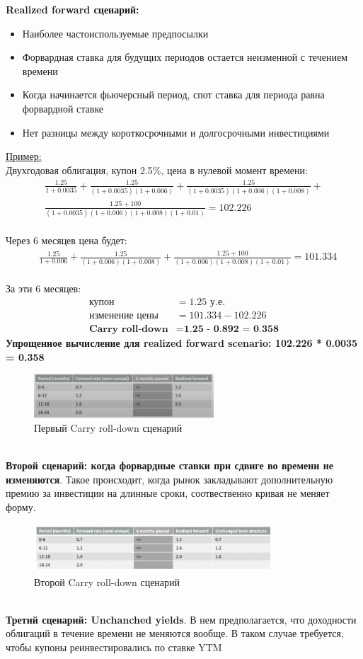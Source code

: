 \documentclass{article}
\begin{document}
\textbf{Realized forward сценарий:}
 \begin{itemize}
     \item Наиболее частоиспользуемые предпосылки
     \item Форвардная ставка для будущих периодов остается неизменной с течением времени
     \item Когда начинается фьючерсный период, спот ставка для периода равна форвардной ставке
     \item Нет разницы между короткосрочными и долгосрочными инвестициями
 \end{itemize}
\underline{Пример:}\\
Двухгодовая облигация, купон 2.5\%, цена в нулевой момент времени:
 \begin{multline*}
    \frac{1.25}{1 + 0.0035} + \frac{1.25}{(1 + 0.0035)(1 + 0.006)} + \frac{1.25}{(1 + 0.0035)(1 + 0.006)(1 + 0.008)} + \\ \frac{1.25 + 100}{(1 + 0.0035)(1 + 0.006)(1 + 0.008)(1 + 0.01)} = 102.226
\end{multline*}\\
Через 6 месяцев цена будет:
\begin{align*}
    & \frac{1.25}{1 + 0.006} + \frac{1.25}{(1 + 0.006)(1 + 0.008)} + \frac{1.25 + 100}{(1 + 0.006)(1 + 0.008)(1 + 0.01)} = 101.334
\end{align*}\\
За эти 6 месяцев:
 \begin{align*}
    \text{купон} & = 1.25 \text{ у.е.}\\
    \text{изменение цены}  & = 101.334 - 102.226\\
    \textbf{Carry roll-down} & = \textbf{1.25 - 0.892 = 0.358}
\end{align*}
\textbf{Упрощенное вычисление для realized forward scenario: 102.226 * 0.0035 = 0.358}
 \begin{figure}[h]
\centering
\includegraphics[width=0.6\textwidth]{first.png}
\caption{Первый Carry roll-down сценарий}
\label{loadings}
\end{figure}\\
\textbf{Второй сценарий: когда форвардные ставки при сдвиге во времени не изменяются}. Такое происходит, когда рынок закладывают дополнительную премию за инвестиции на длинные сроки, соотвественно кривая не меняет форму.
 \begin{figure}[h]
\centering
\includegraphics[width=0.8\textwidth]{unchanged.png}
\caption{Второй Carry roll-down сценарий}
\label{loadings}
\end{figure}\\
\textbf{Третий сценарий: Unchanched yields}. В нем предполагается, что доходности облигаций в течение времени не меняются вообще. В таком случае требуется, чтобы купоны реинвестировались по ставке YTM
\end{document}

